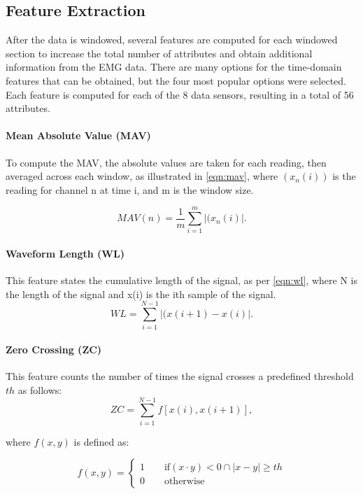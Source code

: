 \documentclass[journal]{IEEEtran}
\begin{document}
	\subsection{Feature Extraction}
	After the data is windowed, several features are computed for each windowed section to increase the total number of attributes and obtain additional information from the EMG data. There are many options for the time-domain features that can be obtained, but the four most popular options were selected. Each feature is computed for each of the 8 data sensors, resulting in a total of 56 attributes.
	
	\paragraph{Mean Absolute Value (MAV)} 
	To compute the MAV, the absolute values are taken for each reading, then averaged across each window, as illustrated in \cref{eqn:mav}, where $(x_n(i))$ is the reading for channel n at time i, and m is the window size.
	
	\begin{equation}
	MAV(n) = \frac{1}{m}\sum_{i=1}^{m}\left|(x_n(i)\right|.
	\label{eqn:mav}
	\end{equation}
	
	\paragraph{Waveform Length (WL)} 
	This feature states the cumulative length of the signal, as per \cref{eqn:wl}, where N is the length of the signal and x(i) is the ith sample of the signal.
	\begin{equation}
	WL = \sum_{i=1}^{N-1}\left|(x(i+1) - x(i)\right|.
	\label{eqn:wl}
	\end{equation}
	
	\paragraph{Zero Crossing (ZC)}
	This feature counts the number of times the signal crosses a predefined threshold $th$ as follows:
	\begin{equation}
	ZC=\sum_{i=1}^{N-1}f\left[x\left(i\right),x\left(i+1\right)\right],
	\label{eqn:zc}
	\end{equation}
	
	\noindent where $f(x,y)$ is defined as:
	
	\begin{equation}
	f(x,y)=\begin{cases}
	1\qquad\text{if}(x\cdot{y})< 0\cap\left|x-y\right|\geq th\\
	0\qquad\text{otherwise}
	\end{cases}
	\label{eqn:zc2}
	\end{equation}
	
\end{document}
